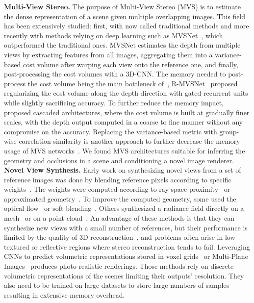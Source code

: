 \noindent\textbf{Multi-View Stereo.} The purpose of Multi-View Stereo (MVS) is to estimate the dense representation of a scene given multiple overlapping images. This field has been extensively studied: first, with now called traditional methods \cite{kolmogorov2002multi, de1999poxels, furukawa2009accurate, schonberger2016pixelwise} and more recently with methods relying on deep learning such as MVSNet~\cite{yao2018mvsnet}, which outperformed the traditional ones. MVSNet estimates the depth from multiple views by extracting features from all images, aggregating them into a variance-based cost volume after warping each view onto the reference one, and finally, post-processing the cost volumes with a 3D-CNN. The memory needed to post-process the cost volume being the main bottleneck of~\cite{yao2018mvsnet}, R-MVSNet~\cite{yao2019recurrent} proposed regularizing the cost volume along the depth direction with gated recurrent units while slightly sacrificing accuracy. To further reduce the memory impact, \cite{gu2020cascade,cheng2020deep,yang2020cost} proposed cascaded architectures, where the cost volume is built at gradually finer scales, with the depth output computed in a coarse to fine manner without any compromise on the accuracy. Replacing the variance-based metric with group-wise correlation similarity is another approach to further decrease the memory usage of MVS networks~\cite{xu2020learning}. We found MVS architectures suitable for inferring the geometry and occlusions in a scene and conditioning a novel image renderer. \\  

\noindent\textbf{Novel View Synthesis.} Early work on synthesizing novel views from a set of reference images was done by blending reference pixels according to specific weights~\cite{debevec1996modeling, levoy1996light}. The weights were computed according to ray-space proximity~\cite{levoy1996light} or approximated geometry~\cite{buehler2001unstructured, debevec1996modeling}. To improve the computed geometry, some used the optical flow~\cite{casas20154d, du2018montage4d} or soft blending~\cite{penner2017soft}. Others synthesized a radiance field directly on a mesh~\cite{debevec1998efficient, huang2020adversarial} or on a point cloud~\cite{aliev2020neural, meshry2019neural}. An advantage of these methods is that they can synthesize new views with a small number of references, but their performance is limited by the quality of 3D reconstruction~\cite{jancosek2011multi, schonberger2016structure}, and problems often arise in low-textured or reflective regions where stereo reconstruction tends to fail. Leveraging CNNs to predict volumetric representations stored in voxel grids~\cite{kalantari2016learning, penner2017soft, henzler2020learning} or Multi-Plane Images~\cite{flynn2016deepstereo, zhou2018stereo, srinivasan2019pushing,flynn2019deepview} produces photo-realistic renderings. Those methods rely on discrete volumetric representations of the scenes limiting their outputs' resolution. They also need to be trained on large datasets to store large numbers of samples resulting in extensive memory overhead. \\

